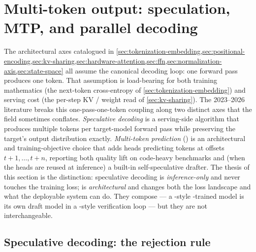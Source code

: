 
\section{Multi-token output: speculation, MTP, and parallel decoding}
\label{sec:multi-token-output}
\label{sec:multitoken}

The architectural axes catalogued in
\cref{sec:tokenization-embedding,sec:positional-encoding,sec:kv-sharing,sec:hardware-attention,sec:ffn,sec:normalization-axis,sec:state-space}
all assume the canonical  decoding loop: one forward pass
produces one token. That assumption is load-bearing for both training
mathematics (the next-token cross-entropy of
\cref{sec:tokenization-embedding}) and serving cost (the per-step KV /
weight read of \cref{sec:kv-sharing}). The 2023--2026 literature breaks
this one-pass-one-token coupling along two distinct axes that the field
sometimes conflates. \emph{Speculative decoding}
\citep{leviathan2023,chen2023-speculative} is a serving-side algorithm
that produces multiple tokens per target-model forward pass while
preserving the target's output distribution exactly. \emph{Multi-token
prediction} () \citep{gloeckle2024-mtp} is an architectural and
training-objective choice that adds heads predicting tokens at offsets
$t+1, \ldots, t+n$, reporting both quality lift on code-heavy
benchmarks and (when the heads are reused at inference) a built-in
self-speculative drafter. The thesis of this section is the distinction:
speculative decoding is \emph{inference-only} and never touches the
training loss;  is \emph{architectural} and changes both the loss
landscape and what the deployable system can do. They compose --- a
-style -trained model \citep[\S 2.3.1]{deepseek-v3} is
its own draft model in a -style verification loop --- but
they are not interchangeable.

\subsection{Speculative decoding: the rejection rule}
\label{sec:mt-leviathan}

